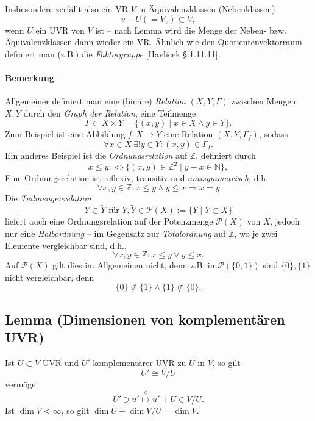  	Insbesondere zerfällt also ein VR $ V $ in Äquivalenzklassen (Nebenklassen)
 	\[
 		v+U (= V_v)\subset V,
 	\]
 	wenn $ U $ ein UVR von $ V $ ist -- nach Lemma wird die Menge der Neben- bzw. Äquivalenzklassen dann wieder ein VR. Ähnlich wie den Quotientenvektorraum definiert man (z.B.) die \emph{Faktorgruppe} [Havlicek §.1.11.11].

 	\paragraph{Bemerkung}
 		Allgemeiner definiert man eine (binäre) \emph{Relation} $ (X,Y,\Gamma) $ zwischen Mengen $ X, Y $ durch den \emph{Graph der Relation}, eine Teilmenge
 		\[
 			\Gamma \subset X\times Y = \{(x,y)\mid x\in X \land y\in Y\}.
 		\]
 		Zum Beispiel ist eine Abbildung $ f:X\to Y $ eine Relation $ (X,Y,\Gamma_f) $, sodass
 		\[
 			\forall x\in X\ \exists ! y\in Y:(x,y)\in \Gamma_f.
 		\]
 		Ein anderes Beispiel ist die \emph{Ordnungsrelation} auf $ \mathbb{Z} $, definiert durch
 		\[
 			x\leq y :\Leftrightarrow \{(x,y)\in \mathbb{Z}^2\mid y-x\in \mathbb{N}\},
 		\]
 		Eine Ordnungsrelation ist reflexiv, transitiv und \emph{antisymmetrisch}, d.h.
 		\[
 			\forall x,y\in \mathbb{Z}: x\leq y\land y\leq x\Rightarrow x=y
 		\]
 		Die \emph{Teilmengenrelation}
 		\[
 			Y\subset\tilde{Y} \text{ für } Y,\tilde{Y}\in \mathcal{P}(X):= \{Y\mid Y\subset X\}
 		\]
 		liefert auch eine Ordnungsrelation auf der Potenzmenge $ \mathcal{P}(X) $ von $ X $, jedoch nur eine \emph{Halbordnung} -- im Gegensatz zur \emph{Totalordnung} auf $ \mathbb{Z} $, wo je zwei Elemente vergleichbar sind, d.h.,
 		\[
 			\forall x,y\in \mathbb{Z}: x\leq y\lor y\leq x.
 		\]
 		Auf $ \mathcal{P}(X) $ gilt dies im Allgemeinen nicht, denn z.B. in $ \mathcal{P}(\{0,1\}) $ sind $ \{0\},\{1\} $ nicht vergleichbar, denn
 		\[
 			\{0\}\not\subset\{1\}\land \{1\}\not\subset \{0\}.
 		\]

 \subsection{Lemma (Dimensionen von komplementären UVR)}
 	\begin{Lemma}
 		Ist $ U\subset V $ UVR und $ U' $ komplementärer UVR zu $ U $ in $ V $, so gilt
 		\[
 			U'\cong V/U
 		\]
 		vermöge
 		\[
 			U'\ni u' \overset{\phi}{\mapsto} u'+U\in V/U.
 		\]
 		Ist $ \dim V<\infty $, so gilt $ \dim U+\dim V/U = \dim V $.
 	\end{Lemma}

